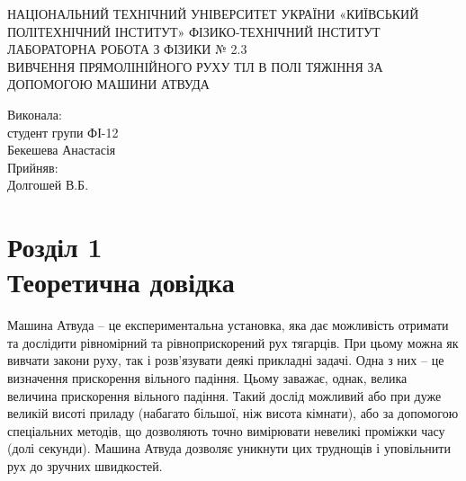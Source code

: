 \documentclass[a4paper,12pt]{article}
\begin{document}
\begin{titlepage}
\begin{center}
\large НАЦІОНАЛЬНИЙ ТЕХНІЧНИЙ УНІВЕРСИТЕТ УКРАЇНИ «КИЇВСЬКИЙ ПОЛІТЕХНІЧНИЙ ІНСТИТУТ» ФІЗИКО-ТЕХНІЧНИЙ ІНСТИТУТ	
\newline\newline\newline\newline\newline\newline\newline\newline\newline
\LARGE{ЛАБОРАТОРНА РОБОТА З ФІЗИКИ № 2.3\\ ВИВЧЕННЯ ПРЯМОЛІНІЙНОГО РУХУ ТІЛ В ПОЛІ ТЯЖІННЯ ЗА ДОПОМОГОЮ МАШИНИ АТВУДА}
\newline\newline\newline\newline\newline\newline\newline\newline\newline
\end{center}
\flushright 
Виконала:\\
студент групи  ФІ-12\\
Бекешева Анастасія \\
Прийняв:\\
Долгошей В.Б.

\end{titlepage}
\newpage

\section*{Розділ 1\\Теоретична довідка}
Машина Атвуда – це експериментальна установка, яка дає можливість отримати та дослідити рівномірний та рівноприскорений рух тягарців. При цьому можна як вивчати закони руху, так і розв’язувати деякі прикладні задачі. Одна з них – це визначення прискорення вільного падіння. Цьому заважає, однак, велика величина прискорення вільного падіння. Такий дослід можливий або при дуже великій висоті приладу (набагато більшої, ніж висота кімнати), або за допомогою спеціальних методів, що дозволяють точно вимірювати невеликі проміжки часу (долі секунди). Машина Атвуда дозволяє уникнути цих труднощів і уповільнити рух до зручних швидкостей.
\end{document}
